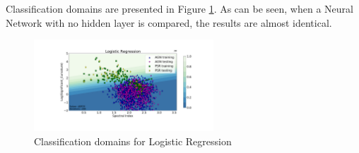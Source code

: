 Classification domains are presented in Figure \ref{fig:LR_domains}. As can be seen, when a Neural Network with no hidden layer is compared, the results are almost identical. \\

\begin{figure}[h]
\hspace*{-1.5cm}
\includegraphics[width=0.6\textwidth]{plots/classification_domains/lr_200_lbfgs.pdf}
\caption{Classification domains for Logistic Regression}
\label{fig:LR_domains}
\end{figure}


